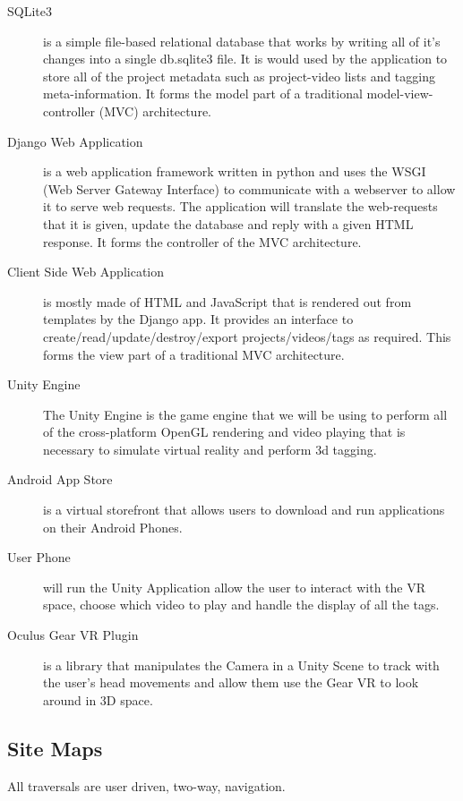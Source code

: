 \documentclass[12pt]{report}
\begin{document}
\begin{description}
    \item [SQLite3] is a simple file-based relational database that works by
        writing all of it's changes into a single db.sqlite3 file. It is would
        used by the application to store all of the project metadata such as
        project-video lists and tagging meta-information. It forms the model
        part of a traditional model-view-controller (MVC) architecture.

    \item [Django Web Application] is a web application framework written in
        python and uses the WSGI (Web Server Gateway Interface) to communicate
        with a webserver to allow it to serve web requests. The application
        will translate the web-requests that it is given, update the database
        and reply with a given HTML response. It forms the controller of the
        MVC architecture.

    \item [Client Side Web Application] is mostly made of HTML and JavaScript
        that is rendered out from templates by the Django app. It provides an
        interface to create/read/update/destroy/export projects/videos/tags as
        required. This forms the view part of a traditional MVC architecture.

 \item [Unity Engine] The Unity Engine is the game engine that we will be using to perform all of the cross-platform OpenGL rendering and video playing that is necessary to simulate virtual reality and perform 3d tagging.
 \item [Android App Store] is a virtual storefront that allows users to download and run applications on their Android Phones. 
 \item [User Phone] will run the Unity Application allow the user to interact with the VR space, choose which video to play and handle the display of all the tags.
 \item [Oculus Gear VR Plugin] is a library that manipulates the Camera in a Unity Scene to track with the user's head movements and allow them use the Gear VR to look around in 3D space.\end{description}
\subsection{Site Maps}
All traversals are user driven, two-way, navigation.
\end{document}
